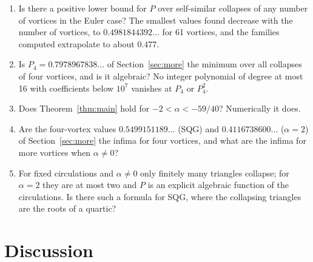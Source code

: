\documentclass[11pt]{article}
\theoremstyle{definition}
\begin{document}
\begin{enumerate}
\item Is there a positive lower bound for $P$ over self-similar collapses of any number of vortices in the Euler case? The smallest values found decrease with the number of vortices, to $0.4981844392\ldots$ for 61 vortices, and the families computed extrapolate to about $0.477$.
\item Is $P_4 = 0.7978967838\ldots$ of Section~\ref{sec:more} the minimum over all collapses of four vortices, and is it algebraic? No integer polynomial of degree at most 16 with coefficients below $10^7$ vanishes at $P_4$ or $P_4^2$.
\item Does Theorem~\ref{thm:main} hold for $-2 < \alpha < -59/40$? Numerically it does.
\item Are the four-vortex values $0.5499151189\ldots$ (SQG) and $0.4116738600\ldots$ ($\alpha = 2$) of Section~\ref{sec:more} the infima for four vortices, and what are the infima for more vortices when $\alpha \ne 0$?
\item For fixed circulations and $\alpha \ne 0$ only finitely many triangles collapse; for $\alpha = 2$ they are at most two and $P$ is an explicit algebraic function of the circulations. Is there such a formula for SQG, where the collapsing triangles are the roots of a quartic?
\end{enumerate}

\section{Discussion}
\end{document}
